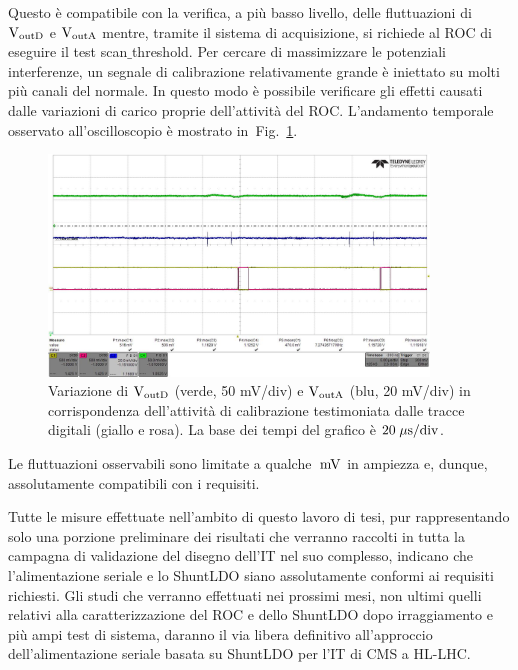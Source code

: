 Questo \`e compatibile con la verifica, a pi\`u basso livello, delle fluttuazioni di $\mathrm{V_{outD}}$ e $\mathrm{V_{outA}}$ mentre, tramite il sistema di acquisizione, si richiede al ROC di eseguire il test scan$\_$threshold. Per cercare di massimizzare le potenziali interferenze, un segnale di calibrazione relativamente grande \`e iniettato su molti pi\`u canali del normale. In questo modo è possibile verificare gli effetti causati dalle variazioni di carico proprie dell'attività del ROC. L'andamento temporale osservato all'oscilloscopio \`e mostrato in~Fig.~\ref{alllin2}.
\begin{figure}
\centering

\includegraphics[width=0.9\textwidth]{Immagini/alllin2}
\caption{Variazione di $\mathrm{V_{outD}}$ (verde, 50 mV/div) e $\mathrm{V_{outA}}$ (blu, 20 mV/div) in corrispondenza dell'attivit\`a di calibrazione testimoniata dalle tracce digitali (giallo e rosa). La base dei tempi del grafico \`e $\mathrm{20\; \mu \rm s/div}$.}
\label{alllin2}

\end{figure}
Le fluttuazioni osservabili sono limitate a qualche $\rm \; mV$ in ampiezza e, dunque, assolutamente compatibili con i requisiti.

Tutte le misure effettuate nell'ambito di questo lavoro di tesi, pur rappresentando solo una porzione preliminare dei risultati che verranno raccolti in tutta la campagna di validazione del disegno dell'IT nel suo complesso, indicano che l'alimentazione seriale e lo ShuntLDO siano assolutamente conformi ai requisiti richiesti. Gli studi che verranno effettuati nei prossimi mesi, non ultimi quelli relativi alla caratterizzazione del ROC e dello ShuntLDO dopo irraggiamento e pi\`u ampi test di sistema, daranno il via libera definitivo all'approccio dell'alimentazione seriale basata su ShuntLDO per l'IT di CMS a HL-LHC. 


